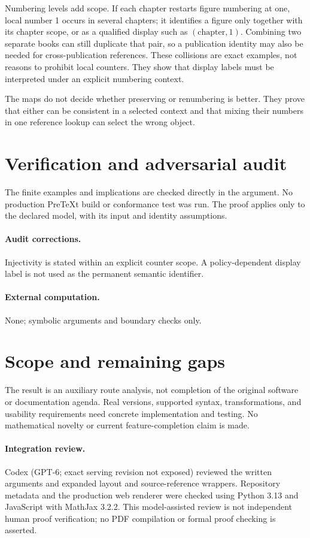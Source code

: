 \documentclass[11pt]{article}
\begin{document}
Numbering levels add scope. If each chapter restarts figure numbering at one, local number 1 occurs in several chapters; it identifies a figure only together with its chapter scope, or as a qualified display such as $(\text{chapter},1)$. Combining two separate books can still duplicate that pair, so a publication identity may also be needed for cross-publication references. These collisions are exact examples, not reasons to prohibit local counters. They show that display labels must be interpreted under an explicit numbering context.

The maps do not decide whether preserving or renumbering is better. They prove that either can be consistent in a selected context and that mixing their numbers in one reference lookup can select the wrong object.
\section{Verification and adversarial audit}
The finite examples and implications are checked directly in the argument. No production PreTeXt build or conformance test was run. The proof applies only to the declared model, with its input and identity assumptions.
\paragraph{Audit corrections.} Injectivity is stated within an explicit counter scope. A policy-dependent display label is not used as the permanent semantic identifier.
\paragraph{External computation.} None; symbolic arguments and boundary checks only.
\section{Scope and remaining gaps}
The result is an auxiliary route analysis, not completion of the original software or documentation agenda. Real versions, supported syntax, transformations, and usability requirements need concrete implementation and testing. No mathematical novelty or current feature-completion claim is made.
\paragraph{Integration review.} Codex (GPT-6; exact serving revision not exposed) reviewed the written arguments and expanded layout and source-reference wrappers. Repository metadata and the production web renderer were checked using Python 3.13 and JavaScript with MathJax 3.2.2. This model-assisted review is not independent human proof verification; no PDF compilation or formal proof checking is asserted.
\end{document}
